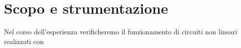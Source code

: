 \section{Scopo e strumentazione}

Nel corso dell'esperienza verificheremo il funzionamento di circuiti non lineari realizzati con
